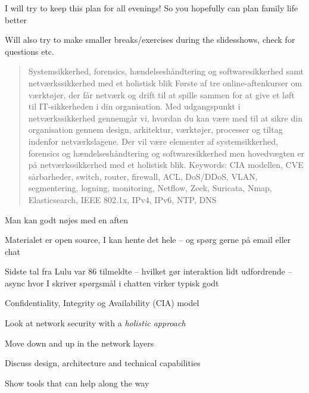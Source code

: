 \documentclass[Screen16to9,17pt]{foils}
\begin{document}
\centerline{I will try to keep this plan for all evenings! So you hopefully can plan family life better}

Will also try to make smaller breaks/exercises during the slidesshows, check for questions etc.



\begin{quote}
Systemsikkerhed, forensics, hændelseshåndtering og softwaresikkerhed samt netværkssikkerhed med et holistisk blik
Første af tre online-aftenkurser om værktøjer, der får netværk og drift til at spille sammen for at give et løft til IT-sikkerheden i din organisation. Med udgangspunkt i netværkssikkerhed gennemgår vi, hvordan du kan være med til at sikre din organisation gennem design, arkitektur, værktøjer, processer og tiltag indenfor netværkslagene. Der vil være elementer af systemsikkerhed, forensics og hændelseshåndtering og softwaresikkerhed men hovedvægten er på netværkssikkerhed med et holistisk blik.
\vskip 5mm
Keywords: CIA modellen, CVE sårbarheder, switch, router, firewall, ACL, DoS/DDoS, VLAN, segmentering, logning, monitoring, Netflow, Zeek, Suricata, Nmap, Elasticsearch, IEEE 802.1x, IPv4, IPv6, NTP, DNS
\end{quote}

\begin{list2}
\item Man kan godt nøjes med en aften
\item Materialet er open source, I kan hente det hele -- og spørg gerne på email eller chat
\item Sidste tal fra Lulu var 86 tilmeldte -- hvilket gør interaktion lidt udfordrende -- async hvor I skriver spørgsmål i chatten virker typisk godt
\end{list2}




\begin{list2}
\item Confidentiality, Integrity og Availability (CIA) model
\item Look at network security with a \emph{holistic approach}
\item Move down and up in the network layers
\item Discuss design, architecture and technical capabilities
\item Show tools that can help along the way
\item
\end{list2}
\end{document}
